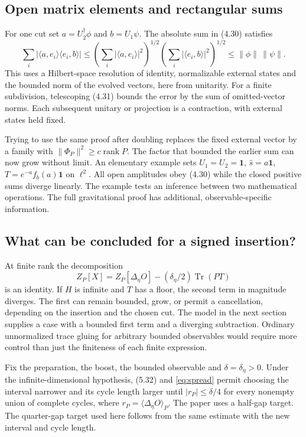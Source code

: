 \documentclass[11pt]{article}
\newcommand{\Tr}{\operatorname{Tr}}
\newcommand{\id}{\mathbf{1}}
\newcommand{\areaop}{\hat s}
\DeclareMathOperator{\rank}{rank}
\begin{document}
\subsection{Open matrix elements and rectangular sums}
For one cut set $a=U_2^\dagger\phi$ and $b=U_1\psi$. The absolute sum in (4.30) satisfies
\[
 \sum_i|\langle a,e_i\rangle\langle e_i,b\rangle|
 \le \left(\sum_i|\langle a,e_i\rangle|^2\right)^{1/2}
       \left(\sum_i|\langle e_i,b\rangle|^2\right)^{1/2}
 \le\|\phi\|\,\|\psi\| .
\]
This uses a Hilbert-space resolution of identity, normalizable external states and the bounded norm of the evolved vectors, here from unitarity. For a finite subdivision, telescoping (4.31) bounds the error by the sum of omitted-vector norms. Each subsequent unitary or projection is a contraction, with external states held fixed.

Trying to use the same proof after doubling replaces the fixed external vector by a family with $\|\Phi_P\|^2\ge c\rank P$. The factor that bounded the earlier sum can now grow without limit. An elementary example sets $U_1=U_2=\id$, $\areaop=a\id$, $T=e^{-a}f_b(a)\id$ on $\ell^2$. All open amplitudes obey (4.30) while the closed positive sums diverge linearly. The example tests an inference between two mathematical operations. The full gravitational proof has additional, observable-specific information.

\subsection{What can be concluded for a signed insertion?}
At finite rank the decomposition
\[
 Z_P[X]=Z_P[\Delta_\eta O]-(\delta_\eta/2)\Tr(PT)
\]
is an identity. If $H$ is infinite and $T$ has a floor, the second term in magnitude diverges. The first can remain bounded, grow, or permit a cancellation, depending on the insertion and the chosen cut. The model in the next section supplies a case with a bounded first term and a diverging subtraction. Ordinary unnormalized trace gluing for arbitrary bounded observables would require more control than just the finiteness of each finite expression.

Fix the preparation, the boost, the bounded observable and $\delta=\delta_\eta>0$. Under the infinite-dimensional hypothesis, (5.32) and \eqref{eq:spread} permit choosing the interval narrower and its cycle length larger until $|r_P|\le\delta/4$ for every nonempty union of complete cycles, where $r_P=\langle\Delta_\eta O\rangle_P$. The paper uses a half-gap target. The quarter-gap target used here follows from the same estimate with the new interval and cycle length.
\end{document}
